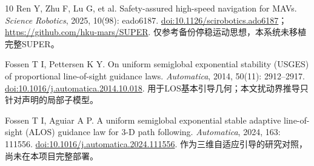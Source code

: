 \documentclass[UTF8,fontset=fandol,a4paper,11pt]{ctexart}
\begin{document}
\begin{thebibliography}{10}
Ren Y, Zhu F, Lu G, et al.
Safety-assured high-speed navigation for MAVs.
\textit{Science Robotics}, 2025, 10(98): eado6187.
\href{https://doi.org/10.1126/scirobotics.ado6187}{doi:10.1126/scirobotics.ado6187}；
\url{https://github.com/hku-mars/SUPER}.
仅参考备份停稳运动思想，本系统未移植完整SUPER。

Fossen T I, Pettersen K Y.
On uniform semiglobal exponential stability (USGES) of proportional line-of-sight guidance laws.
\textit{Automatica}, 2014, 50(11): 2912--2917.
\href{https://doi.org/10.1016/j.automatica.2014.10.018}{doi:10.1016/j.automatica.2014.10.018}.
用于LOS基本引导几何；本文扰动界推导只针对声明的局部子模型。

Fossen T I, Aguiar A P.
A uniform semiglobal exponential stable adaptive line-of-sight (ALOS) guidance law for 3-D path following.
\textit{Automatica}, 2024, 163: 111556.
\href{https://doi.org/10.1016/j.automatica.2024.111556}{doi:10.1016/j.automatica.2024.111556}.
作为三维自适应引导的研究对照，尚未在本项目完整部署。
\end{thebibliography}
\endgroup
\end{document}
